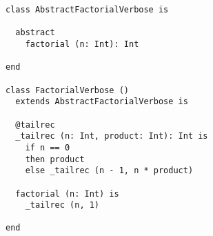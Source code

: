 \begin{lstlisting}[label={lst:exampleFactorialVerbose}]
class AbstractFactorialVerbose is

  abstract
    factorial (n: Int): Int

end

class FactorialVerbose ()
  extends AbstractFactorialVerbose is

  @tailrec
  _tailrec (n: Int, product: Int): Int is
    if n == 0
    then product
    else _tailrec (n - 1, n * product)

  factorial (n: Int) is
    _tailrec (n, 1)

end
\end{lstlisting}



